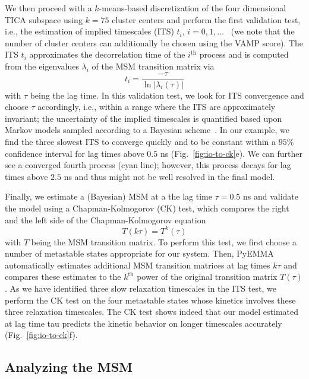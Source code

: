 \documentclass[9pt,tutorial]{livecoms}
\begin{document}
We then proceed with a $k$-means-based discretization of the four dimensional TICA subspace using $k=75$ cluster centers and perform the first validation test, i.e., the estimation of implied timescales (ITS) $t_i$, $i=0, 1,\dots$~\cite{swope-its}
(we note that the number of cluster centers can additionally be chosen using the VAMP score).
The ITS $t_i$ approximates the decorrelation time of the $i^\textrm{th}$ process and is computed from the eigenvalues $\lambda_i$ of the MSM transition matrix via
\begin{equation}
\label{eq:its}
t_i = \frac{-\tau}{\ln\left|\lambda_i(\tau)\right|}
\end{equation}
with $\tau$ being the lag time.
In this validation test, we look for ITS convergence and choose $\tau$ accordingly, i.e., within a range where the ITS are approximately invariant; the uncertainty of the implied timescales is quantified based upon Markov models sampled according to a Bayesian scheme~\cite{ben-rev-msm,noe-tmat-sampling}.
In our example, we find the three slowest ITS to converge quickly and to be constant within a $95\%$ confidence interval for lag times above $0.5$ ns (Fig.~\ref{fig:io-to-ck}e).
We can further see a converged fourth process (cyan line); however, this process decays for lag times above $2.5$ ns and thus might not be well resolved in the final model.

Finally, we estimate a (Bayesian) MSM at a the lag time $\tau=0.5$ ns and validate the model using a Chapman-Kolmogorov (CK) test, which compares the right and the left side of the Chapman-Kolmogorov equation
\begin{equation}
\label{eq:ck}
T(k \tau) = T^k(\tau)
\end{equation}
with $T$ being the MSM transition matrix.
To perform this test, we first choose a number of metastable states appropriate for our system. Then, PyEMMA automatically estimates additional MSM transition matrices at lag times $k \tau$ and compares these estimates to the $k^\textrm{th}$ power of the original transition matrix $T(\tau)$.
As we have identified three slow relaxation timescales in the ITS test,
we perform the CK test on the four metastable states whose kinetics involves these three relaxation timescales.
The CK test shows indeed that our model estimated at lag time tau predicts the kinetic behavior on longer timescales accurately (Fig.~\ref{fig:io-to-ck}f).

\subsection{Analyzing the MSM}
\end{document}
